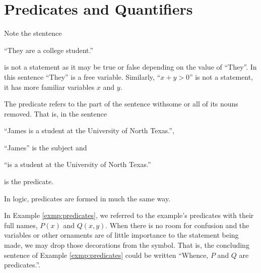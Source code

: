 \guard

\section{Predicates and Quantifiers}
\label{sec:predicatesAndQuantifiers}

Note the stentence
  \begin{center}
    ``They are a college student.''
  \end{center}
  is not a statement as it may be true or false depending on the value of ``They''.
In this sentence ``They'' is a free variable.
Similarly, ``$x+y>0$'' is not a statement, it has more familiar variables $x$ and $y$.

The predicate refers to the part of the sentence withsome or all of its nouns removed.
That is, in the sentence
  \begin{center}
    ``James is a student at the University of North Texas.'',
  \end{center}
  ``James'' is the subject and
  \begin{center}
    ``is a student at the University of North Texas.''
  \end{center}
  is the predicate.

In logic, predicates are formed in much the same way.

In Example \ref{exmp:predicates}, we referred to the example's predicates with their full names, $P(x)$ and $Q(x,y)$.
When there is no room for confusion and the variables or other ornaments are of little importance to the statement being made, we may drop those decorations from the symbol.
That is, the concluding sentence of Example \ref{exmp:predicates} could be written ``Whence, $P$ and $Q$ are predicates.''.





